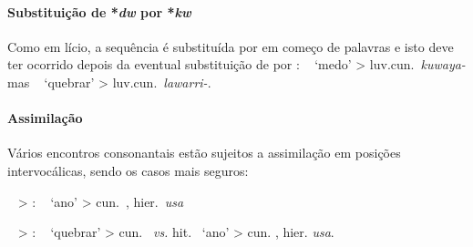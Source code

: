 \paragraph{Substituição de *\emph{dw} por *\emph{kw}}
Como em lício, a sequência  é substituída por
 em começo de palavras e isto deve ter ocorrido depois da
eventual substituição de  por :
\pac~ `medo' > luv.cun.\ \emph{kuwaya-} mas
\pac~ `quebrar' > luv.cun.\ \emph{lawarri-}.

\paragraph{Assimilação} Vários encontros consonantais estão sujeitos
a assimilação em posições intervocálicas, sendo os casos mais seguros:
\begin{compactitem}
	\item  \pac~ > : \pac~
	`ano' > cun.\ \emph{}, hier.\ \emph{usa}
	\item  \pac~ > :
	\pac~
	`quebrar' > cun.\ \emph{} \emph{vs.}
	hit.\ \emph{}
	`ano' > cun. \emph{}, hier. \emph{usa}.
\end{compactitem}

\clearpage
